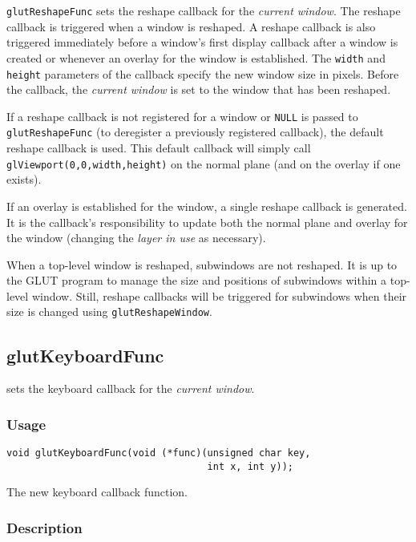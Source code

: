 {\tt glutReshapeFunc} sets the reshape callback for the {\em current window}.
The reshape callback is triggered when a window is reshaped.
A reshape callback is also triggered immediately before a window's first display callback
after a window is created or whenever an overlay for the window is established.
The {\tt width} and {\tt height} parameters of the callback
specify the new window size in pixels.  Before the callback, the {\em current
window} is set to the window that has been reshaped.

If a reshape callback is not registered for a window or {\tt NULL} is
passed to {\tt glutReshapeFunc} (to deregister a previously registered
callback), the default reshape callback is used.  This default callback
will simply call {\tt glViewport(0,0,width,height)} on the normal plane
(and on the overlay if one exists).

If an overlay is established for the window, a single reshape callback is generated.
It is the callback's responsibility to update both the normal plane and
overlay for the window (changing the {\em layer in use} as necessary).

When a top-level window is reshaped, subwindows are not reshaped.  It is
up to the GLUT program to manage the size and positions of subwindows
within a top-level window.  Still, reshape callbacks will be triggered for
subwindows when their size is changed using {\tt glutReshapeWindow}.

\subsection{glutKeyboardFunc}

 sets the keyboard callback for the {\em current window}.

\subsubsection*{Usage}

\begin{verbatim}
void glutKeyboardFunc(void (*func)(unsigned char key,
                                   int x, int y));
\end{verbatim}
\begin{description}
\itemsep 0in
\item[{\tt func}]
The new keyboard callback function.
\end{description}

\subsubsection*{Description}

